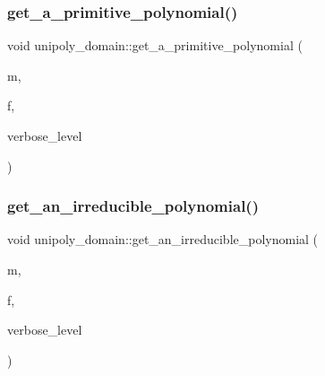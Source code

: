 \subsubsection{\texorpdfstring{get\+\_\+a\+\_\+primitive\+\_\+polynomial()}{get\_a\_primitive\_polynomial()}}
{\footnotesize\ttfamily void unipoly\+\_\+domain\+::get\+\_\+a\+\_\+primitive\+\_\+polynomial (\begin{DoxyParamCaption}\item[{\mbox{\hyperlink{galois_8h_a77ca58de3d2da6172242493dd9c8aaa8}{unipoly\+\_\+object}} \&}]{m,  }\item[{\mbox{\hyperlink{galois_8h_a09fddde158a3a20bd2dcadb609de11dc}{I\+NT}}}]{f,  }\item[{\mbox{\hyperlink{galois_8h_a09fddde158a3a20bd2dcadb609de11dc}{I\+NT}}}]{verbose\+\_\+level }\end{DoxyParamCaption})}

\mbox{\label{classunipoly__domain_a5ca082ed524eb5f592ef324ee468ec37}} 
\subsubsection{\texorpdfstring{get\+\_\+an\+\_\+irreducible\+\_\+polynomial()}{get\_an\_irreducible\_polynomial()}}
{\footnotesize\ttfamily void unipoly\+\_\+domain\+::get\+\_\+an\+\_\+irreducible\+\_\+polynomial (\begin{DoxyParamCaption}\item[{\mbox{\hyperlink{galois_8h_a77ca58de3d2da6172242493dd9c8aaa8}{unipoly\+\_\+object}} \&}]{m,  }\item[{\mbox{\hyperlink{galois_8h_a09fddde158a3a20bd2dcadb609de11dc}{I\+NT}}}]{f,  }\item[{\mbox{\hyperlink{galois_8h_a09fddde158a3a20bd2dcadb609de11dc}{I\+NT}}}]{verbose\+\_\+level }\end{DoxyParamCaption})}

\mbox{\label{classunipoly__domain_a3557f6e11fd772949ed29814f29df339}} 
